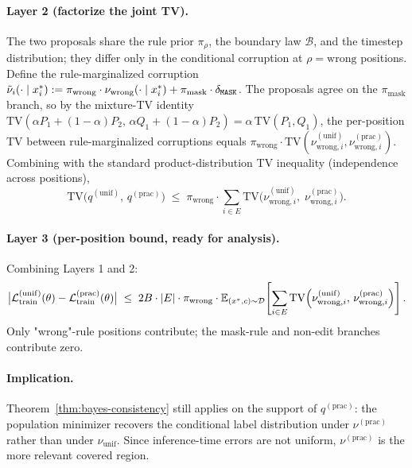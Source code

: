 \paragraph{Layer 2 (factorize the joint TV).}
The two proposals share the rule prior $\pi_\rho$, the boundary law $\mathcal{B}$, and the timestep distribution; they differ only in the conditional corruption at $\rho = \mathrm{wrong}$ positions. Define the rule-marginalized corruption $\tilde{\nu}_i(\cdot \mid x^{\ast}_i) := \pi_{\mathrm{wrong}} \cdot \nu_{\mathrm{wrong}}(\cdot \mid x^{\ast}_i) + \pi_{\mathrm{mask}} \cdot \delta_{\texttt{MASK}}$. The proposals agree on the $\pi_{\mathrm{mask}}$ branch, so by the mixture-TV identity $\mathrm{TV}(\alpha P_1 + (1-\alpha) P_2,\, \alpha Q_1 + (1-\alpha) P_2) = \alpha \,\mathrm{TV}(P_1, Q_1)$, the per-position TV between rule-marginalized corruptions equals $\pi_{\mathrm{wrong}} \cdot \mathrm{TV}(\nu^{(\mathrm{unif})}_{\mathrm{wrong}, i}, \nu^{(\mathrm{prac})}_{\mathrm{wrong}, i})$. Combining with the standard product-distribution TV inequality (independence across positions),
\[
\mathrm{TV}\!\big(q^{(\mathrm{unif})},\, q^{(\mathrm{prac})}\big) \;\leq\; \pi_{\mathrm{wrong}} \cdot \sum_{i \in E} \mathrm{TV}\!\big(\nu^{(\mathrm{unif})}_{\mathrm{wrong}, i},\; \nu^{(\mathrm{prac})}_{\mathrm{wrong}, i}\big).
\]

\paragraph{Layer 3 (per-position bound, ready for analysis).}
Combining Layers 1 and 2:
\begin{equation}
\big|\mathcal{L}_{\mathrm{train}}^{(\mathrm{unif})}(\theta) - \mathcal{L}_{\mathrm{train}}^{(\mathrm{prac})}(\theta)\big| \;\leq\; 2B \cdot |E| \cdot \pi_{\mathrm{wrong}} \cdot \mathbb{E}_{(x^{\ast}, c) \sim \mathcal{D}}\!\left[\sum_{i \in E} \mathrm{TV}\!\left(\nu^{(\mathrm{unif})}_{\mathrm{wrong}, i},\,\nu^{(\mathrm{prac})}_{\mathrm{wrong}, i}\right)\right].
\label{eq:topk-tv-bound}
\end{equation}
Only "wrong"-rule positions contribute; the mask-rule and non-edit branches contribute zero.

\paragraph{Implication.}
Theorem~\ref{thm:bayes-consistency} still applies on the support of $q^{(\mathrm{prac})}$: the population minimizer recovers the conditional label distribution under $\nu^{(\mathrm{prac})}$ rather than under $\nu_{\mathrm{unif}}$. Since inference-time errors are not uniform, $\nu^{(\mathrm{prac})}$ is the more relevant covered region.

